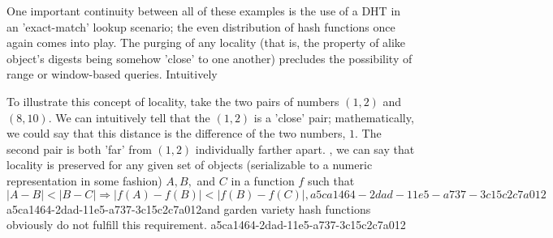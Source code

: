 \documentclass[12pt]{article}
\begin{document}
\par One important continuity between all of these examples is the use of a DHT in an 'exact-match' lookup scenario; the even distribution of hash functions once again comes into play. The purging of any locality (that is, the property of alike object's digests being somehow 'close' to one another) precludes the possibility of range or window-based queries. Intuitively

\par To illustrate this concept of locality, take the two pairs of numbers $(1,2)$ and $(8,10)$. We can intuitively tell that the $(1,2)$ is a 'close' pair; mathematically, we could say that this distance is the difference of the two numbers, $1$. The second pair is both 'far' from $(1,2)$ individually farther apart. , we can say that locality is preserved for any given set of objects (serializable to a numeric representation in some fashion) $A,B,$ and $C$ in a function $f$ such that
\begin{equation}
|A-B| < |B-C| \Rightarrow |f(A)-f(B)| < |f(B) - f(C)|,
a5ca1464-2dad-11e5-a737-3c15c2c7a012\end{equation}
a5ca1464-2dad-11e5-a737-3c15c2c7a012and garden variety hash functions obviously do not fulfill this requirement.
a5ca1464-2dad-11e5-a737-3c15c2c7a012
\printbibliography
\end{document}
